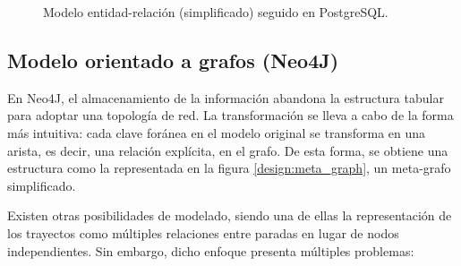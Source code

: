 \begin{figure}[ht]
    \caption{Modelo entidad-relación (simplificado) seguido en PostgreSQL.}
    \label{design:er_model}
\end{figure}

\subsection{Modelo orientado a grafos (Neo4J)}

En Neo4J, el almacenamiento de la información abandona la estructura tabular para adoptar una topología de red. La transformación se lleva a cabo de la forma más intuitiva: cada clave foránea en el modelo original se transforma en una arista, es decir, una relación explícita, en el grafo. De esta forma, se obtiene una estructura como la representada en la figura \ref{design:meta_graph}, un meta-grafo simplificado.

Existen otras posibilidades de modelado, siendo una de ellas la representación de los trayectos como múltiples relaciones entre paradas en lugar de nodos independientes. Sin embargo, dicho enfoque presenta múltiples problemas:

